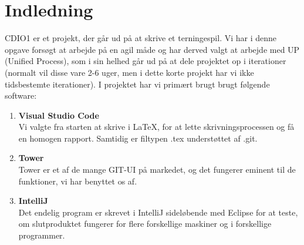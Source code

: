 \chapter{Indledning}
CDIO1 er et projekt, der går ud på at skrive et terningespil.
Vi har i denne opgave forsøgt at arbejde på en agil måde og har derved valgt at arbejde med UP (Unified Process), som i sin helhed går ud på at dele projektet op i iterationer (normalt vil disse vare 2-6 uger, men i dette korte projekt har vi ikke tidsbestemte iterationer).
I projektet har vi primært brugt brugt følgende software:
\begin{enumerate}
    \item \textbf{Visual Studio Code}
    \\ Vi valgte fra starten at skrive i LaTeX, for at lette skrivningsprocessen og få en homogen rapport.
    Samtidig er filtypen .tex understøttet af .git.
    \item \textbf{Tower}
    \\Tower er et af de mange GIT-UI på markedet, og det fungerer eminent til de funktioner, vi har benyttet os af.
    \item \textbf{IntelliJ}
    \\Det endelig program er skrevet i IntelliJ sideløbende med Eclipse for at teste, om slutproduktet fungerer for flere forskellige maskiner og i forskellige programmer.

\end{enumerate}